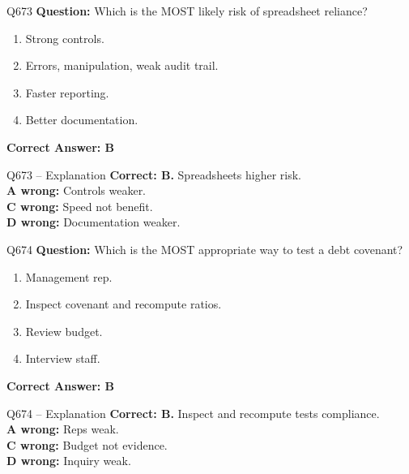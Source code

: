 \documentclass[aspectratio=169,10pt]{beamer}
\begin{document}
	\begin{frame}[t]{Q673}
		\small
		\textbf{Question:} Which is the MOST likely risk of spreadsheet reliance?
		\begin{enumerate}[label=\Alph*.,itemsep=1pt,topsep=2pt]
			\item Strong controls.
			\item Errors, manipulation, weak audit trail.
			\item Faster reporting.
			\item Better documentation.
		\end{enumerate}
		\vspace{4pt}
		\textbf{Correct Answer: B}
	\end{frame}
	
	\begin{frame}[t]{Q673 -- Explanation}
		\small
		\textbf{Correct: B.} Spreadsheets higher risk. \\[4pt]
		\textbf{A wrong:} Controls weaker. \\[2pt]
		\textbf{C wrong:} Speed not benefit. \\[2pt]
		\textbf{D wrong:} Documentation weaker.
	\end{frame}
	
	\begin{frame}[t]{Q674}
		\small
		\textbf{Question:} Which is the MOST appropriate way to test a debt covenant?
		\begin{enumerate}[label=\Alph*.,itemsep=1pt,topsep=2pt]
			\item Management rep.
			\item Inspect covenant and recompute ratios.
			\item Review budget.
			\item Interview staff.
		\end{enumerate}
		\vspace{4pt}
		\textbf{Correct Answer: B}
	\end{frame}
	
	\begin{frame}[t]{Q674 -- Explanation}
		\small
		\textbf{Correct: B.} Inspect and recompute tests compliance. \\[4pt]
		\textbf{A wrong:} Reps weak. \\[2pt]
		\textbf{C wrong:} Budget not evidence. \\[2pt]
		\textbf{D wrong:} Inquiry weak.
	\end{frame}
	
\end{document}
